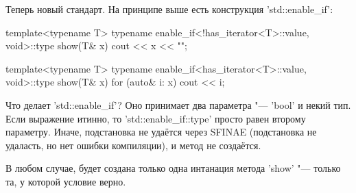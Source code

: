 Теперь новый стандарт. На принципе выше есть конструкция \cpp'std::enable_if':
\begin{cppcode}
template<typename T>
typename enable_if<!has_iterator<T>::value, void>::type show(T& x) {
	cout << x << "\n";
}

template<typename T>
typename enable_if<has_iterator<T>::value, void>::type show(T& x) {
	for (auto& i: x)
		cout << i;
}
\end{cppcode}
Что делает \cpp'std::enable_if'?
Оно принимает два параметра "--- \cpp'bool' и некий тип.
Если выражение итинно, то \cpp'std::enable_if::type' просто равен второму параметру.
Иначе, подстановка не удаётся через SFINAE (подстановка не удаласть, но нет ошибки компиляции), и метод не создаётся.

В любом случае, будет создана только одна интанация метода \cpp'show' "--- только та, у которой условие верно.